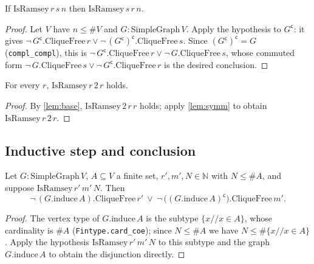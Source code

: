 \begin{lemma}
    \label{lem:symm}
    \leanok
    If $\mathrm{IsRamsey}\, r\, s\, n$ then $\mathrm{IsRamsey}\, s\, r\, n$.
\end{lemma}
\begin{proof}
    Let $V$ have $n \le \#V$ and $G : \mathrm{SimpleGraph}\, V$. Apply the
    hypothesis to $G^{\mathsf c}$: it gives
    $\neg\, G^{\mathsf c}.\mathrm{CliqueFree}\, r \lor \neg\,
    (G^{\mathsf c})^{\mathsf c}.\mathrm{CliqueFree}\, s$. Since
    $(G^{\mathsf c})^{\mathsf c} = G$ (\texttt{compl\_compl}), this is
    $\neg\, G^{\mathsf c}.\mathrm{CliqueFree}\, r \lor \neg\, G.\mathrm{CliqueFree}\, s$,
    whose commuted form $\neg\, G.\mathrm{CliqueFree}\, s \lor \neg\,
    G^{\mathsf c}.\mathrm{CliqueFree}\, r$ is the desired conclusion.
\end{proof}

\begin{lemma}[Base case $s = 2$]
    \label{lem:base-right}
    \leanok
    For every $r$, $\mathrm{IsRamsey}\, r\, 2\, r$ holds.
\end{lemma}
\begin{proof}
    By \cref{lem:base}, $\mathrm{IsRamsey}\, 2\, r\, r$ holds; apply
    \cref{lem:symm} to obtain $\mathrm{IsRamsey}\, r\, 2\, r$.
\end{proof}

\subsection{Inductive step and conclusion}

\begin{lemma}
    \label{lem:ramsey-induce}
    \leanok
    Let $G : \mathrm{SimpleGraph}\, V$, $A \subseteq V$ a finite set,
    $r', m', N \in \mathbb{N}$ with $N \le \#A$, and suppose
    $\mathrm{IsRamsey}\, r'\, m'\, N$. Then
    \[
        \neg\,(G.\mathrm{induce}\, A).\mathrm{CliqueFree}\, r' \ \lor\
        \neg\,\bigl((G.\mathrm{induce}\, A)^{\mathsf c}\bigr).\mathrm{CliqueFree}\, m' .
    \]
\end{lemma}
\begin{proof}
    The vertex type of $G.\mathrm{induce}\, A$ is the subtype
    $\{x \mathbin{//} x \in A\}$, whose cardinality is $\#A$
    (\texttt{Fintype.card\_coe}); since $N \le \#A$ we have
    $N \le \#\{x \mathbin{//} x \in A\}$. Apply the hypothesis
    $\mathrm{IsRamsey}\, r'\, m'\, N$ to this subtype and the graph
    $G.\mathrm{induce}\, A$ to obtain the disjunction directly.
\end{proof}

